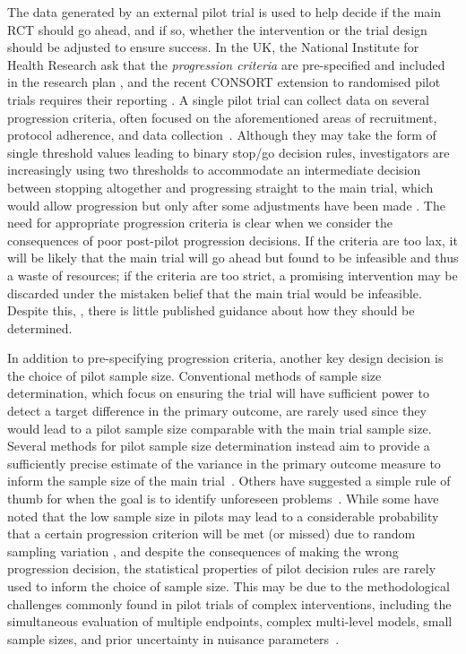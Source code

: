 \documentclass[AMA,STIX1COL]{WileyNJD-v2}
\begin{document}
The data generated by an external pilot trial is used to help decide if the main RCT should go ahead, and if so, whether the intervention or the trial design should be adjusted to ensure success. In the UK, the National Institute for Health Research ask that the \emph{progression criteria} are pre-specified and included in the research plan \cite{NIHR2017}, and the recent CONSORT extension to randomised pilot trials requires their reporting \cite{Eldridge2016a}. A single pilot trial can collect data on several progression criteria, often focused on the aforementioned areas of recruitment, protocol adherence, and data collection~\cite{Avery2017}. Although they may take the form of single threshold values leading to binary stop/go decision rules, investigators are increasingly using two thresholds to accommodate an intermediate decision between stopping altogether and progressing straight to the main trial, which would allow progression but only after some adjustments have been made \cite{Eldridge2016a}. The need for appropriate progression criteria is clear when we consider the consequences of poor post-pilot progression decisions. If the criteria are too lax, it will be likely that the main trial will go ahead but found to be infeasible and thus a waste of resources; if the criteria are too strict, a promising intervention may be discarded under the mistaken belief that the main trial would be infeasible. Despite this, , there is little published guidance about how they should be determined\cite{Avery2017, Hampson2017}.

In addition to pre-specifying progression criteria, another key design decision is the choice of pilot sample size. Conventional methods of sample size determination, which focus on ensuring the trial will have sufficient power to detect a target difference in the primary outcome, are rarely used since they would lead to a pilot sample size comparable with the main trial sample size. Several methods for pilot sample size determination instead aim to provide a sufficiently precise estimate of the variance in the primary outcome measure to inform the sample size of the main trial~\cite{Browne1995, Julious2005, Sim2012, Teare2014, Eldridge2015, Whitehead2015}. Others have suggested a simple rule of thumb for when the goal is to identify unforeseen problems~\cite{Viechtbauer2015}. While some have noted that the low sample size in pilots may lead to a considerable probability that a certain progression criterion will be met (or missed) due to random sampling variation \cite{Eldridge2015, Cooper2018}, and despite the consequences of making the wrong progression decision, the statistical properties of pilot decision rules are rarely used to inform the choice of sample size. This may be due to the methodological challenges commonly found in  pilot trials of complex interventions, including the simultaneous evaluation of multiple endpoints, complex multi-level models, small sample sizes, and prior uncertainty in nuisance parameters~\cite{Wilson2015}.
\end{document}
